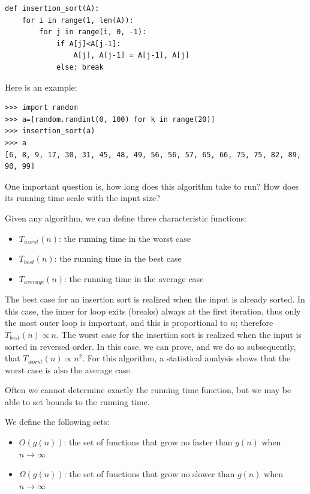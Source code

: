 \documentclass[justified, sixbynine]{tufte-book}
\theoremstyle{plain}%
\newtheorem * {corollary}{Corollary}
\theoremstyle{definition}
\theoremstyle{remark}
\newtheorem * {remark}{Remark}
\newtheorem * {note}{Note}
\begin{document}
\begin{fullwidth}
\begin{lstlisting}
def insertion_sort(A):
    for i in range(1, len(A)):
        for j in range(i, 0, -1):
            if A[j]<A[j-1]:
                A[j], A[j-1] = A[j-1], A[j]
            else: break
\end{lstlisting}

Here is an example:

\begin{lstlisting}
>>> import random
>>> a=[random.randint(0, 100) for k in range(20)]
>>> insertion_sort(a)
>>> a
[6, 8, 9, 17, 30, 31, 45, 48, 49, 56, 56, 57, 65, 66, 75, 75, 82, 89, 90, 99]
\end{lstlisting}

One important question is, how long does this algorithm take to run? How does its running time scale with the input size?

Given any algorithm, we can define three characteristic functions:

\begin{itemize}
\item  $T_{worst}(n)$: the running time in the worst case

\item  $T_{best}(n)$: the running time in the best case

\item  $T_{average}(n)$: the running time in the average case
\end{itemize}

The best case for an insertion sort is realized when the input is already sorted. In this case, the inner for loop exits (breaks) always at the first iteration, thus only the most outer loop is important, and this is proportional to $n$; therefore $T_{best}(n) \propto n$. The worst case for the insertion sort is realized when the input is sorted in reversed order. In this case, we can prove, and we do so subsequently, that $T_{worst}(n) \propto n^2$. For this algorithm, a statistical analysis shows that the worst case is also the average case.

Often we cannot determine exactly the running time function, but we may be able to set bounds to the running time.

We define the following sets:

\begin{itemize}
\item  $O(g(n))$: the set of functions that grow no faster than $g(n)$ when $%
n\rightarrow \infty $

\item  $\Omega (g(n))$: the set of functions that grow no slower than $g(n)$ when $%
n\rightarrow \infty $


\end{itemize}
\end{fullwidth}
\end{document}
